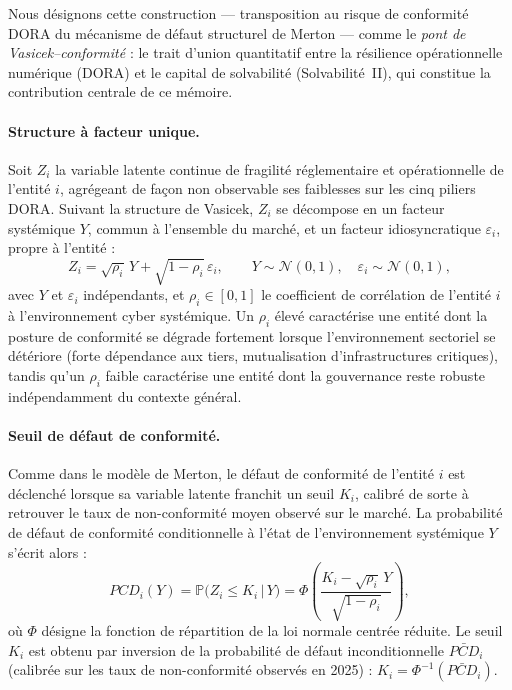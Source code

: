 \documentclass[11pt,a4paper]{article}
\theoremstyle{navystyle}
\theoremstyle{navydef}
\begin{document}
Nous désignons cette construction --- transposition au risque de conformité
DORA du mécanisme de défaut structurel de Merton --- comme le \emph{pont de
Vasicek--conformité} : le trait d'union quantitatif entre la résilience
opérationnelle numérique (DORA) et le capital de solvabilité
(Solvabilité~II), qui constitue la contribution centrale de ce mémoire.

\paragraph{Structure à facteur unique.} Soit $Z_i$ la variable latente
continue de fragilité réglementaire et opérationnelle de l'entité $i$,
agrégeant de façon non observable ses faiblesses sur les cinq piliers DORA.
Suivant la structure de Vasicek, $Z_i$ se décompose en un facteur
systémique $Y$, commun à l'ensemble du marché, et un facteur
idiosyncratique $\varepsilon_i$, propre à l'entité :
\begin{equation}
Z_i = \sqrt{\rho_i}\,Y + \sqrt{1-\rho_i}\,\varepsilon_i,
\qquad Y \sim \mathcal{N}(0,1), \quad \varepsilon_i \sim \mathcal{N}(0,1),
\end{equation}
avec $Y$ et $\varepsilon_i$ indépendants, et $\rho_i \in [0,1]$ le
coefficient de corrélation de l'entité $i$ à l'environnement cyber
systémique. Un $\rho_i$ élevé caractérise une entité dont la posture de
conformité se dégrade fortement lorsque l'environnement sectoriel se
détériore (forte dépendance aux tiers, mutualisation d'infrastructures
critiques), tandis qu'un $\rho_i$ faible caractérise une entité dont la
gouvernance reste robuste indépendamment du contexte général.

\paragraph{Seuil de défaut de conformité.} Comme dans le modèle de Merton, le
défaut de conformité de l'entité $i$ est déclenché lorsque sa variable
latente franchit un seuil $K_i$, calibré de sorte à retrouver le taux de
non-conformité moyen observé sur le marché. La probabilité de défaut de
conformité conditionnelle à l'état de l'environnement systémique $Y$
s'écrit alors :
\begin{equation}
PCD_i(Y) = \mathbb{P}\bigl(Z_i \leq K_i \,\big|\, Y\bigr)
= \Phi\!\left(\frac{K_i - \sqrt{\rho_i}\,Y}{\sqrt{1-\rho_i}}\right),
\end{equation}
où $\Phi$ désigne la fonction de répartition de la loi normale centrée
réduite. Le seuil $K_i$ est obtenu par inversion de la probabilité de défaut
inconditionnelle $\bar{PCD}_i$ (calibrée sur les taux de non-conformité
observés en 2025) : $K_i = \Phi^{-1}(\bar{PCD}_i)$.
\end{document}
